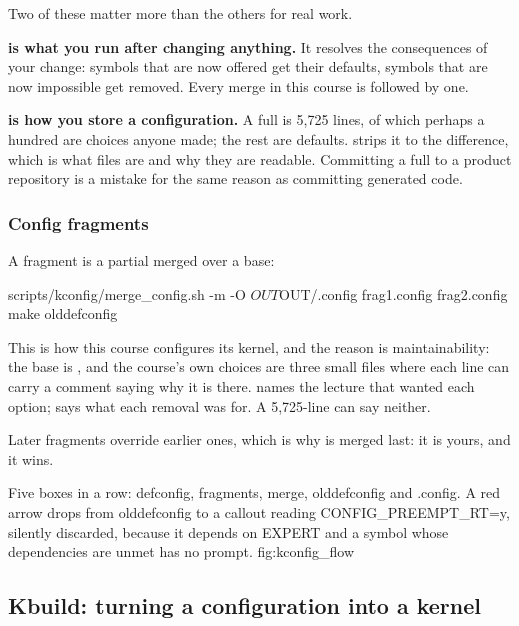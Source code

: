 \noindent Two of these matter more than the others for real work.

\textbf{ is what you run after changing anything.} It resolves the consequences
of your change: symbols that are now offered get their defaults, symbols that are now impossible get
removed. Every merge in this course is followed by one.

\textbf{ is how you store a configuration.} A full  is 5,725
lines, of which perhaps a hundred are choices anyone made; the rest are defaults.
 strips it to the difference, which is what
 files are and why they are readable. Committing a full
 to a product repository is a mistake for the same reason as committing generated
code.

\subsubsection{Config fragments}
\label{c3:app:b:config-fragments}

A fragment is a partial  merged over a base:

\begin{shell}
scripts/kconfig/merge_config.sh -m -O $OUT $OUT/.config frag1.config frag2.config
make olddefconfig
\end{shell}

\noindent This is how this course configures its kernel, and the reason is maintainability: the base
is , and the course's own choices are three small files where each line can carry a
comment saying why it is there.  names the lecture that wanted each option;
 says what each removal was for. A 5,725-line  can say
neither.

Later fragments override earlier ones, which is why  is merged last: it is
yours, and it wins.

  {Five boxes in a row: defconfig, fragments, merge, olddefconfig and .config. A red arrow drops from
   olddefconfig to a callout reading CONFIG\_PREEMPT\_RT=y, silently discarded, because it depends
   on EXPERT and a symbol whose dependencies are unmet has no prompt.}
  {fig:kconfig_flow}

\subsection{Kbuild: turning a configuration into a kernel}
\label{c3:app:b4}

